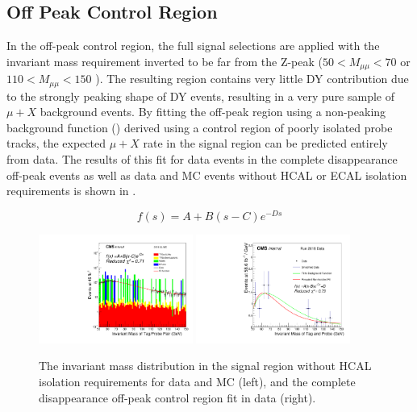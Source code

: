 \subsection{Off Peak Control Region}
In the off-peak control region, the full signal selections are applied with the invariant mass requirement inverted to be far from the Z-peak ($50<M_{\mu\mu}<70$ or $110<M_{\mu\mu}<150$ \GeV). 
The resulting region contains very little DY contribution due to the strongly peaking shape of DY events, resulting in a very pure sample of $\mu+X$ background events. 
By fitting the off-peak region using a non-peaking background function () derived using a control region of poorly isolated probe tracks, the expected $\mu+X$ rate in the signal region can be predicted entirely from data. 
The results of this fit for data events in the complete disappearance off-peak events as well as data and MC events without HCAL or ECAL isolation requirements is shown in .

\begin{equation} 
    \label{eq:bkgfunc}
    f(s)=A+B(s-C)e^{-Ds} 
\end{equation}

\begin{figure}[htp]
    \centering
    \includegraphics[width=0.45\textwidth]{figures/offPeakCr_noIso.pdf}
    \hspace{0.01\textwidth}
    \includegraphics[width=0.45\textwidth]{figures/offPeakCr_fit.pdf} 
     \caption[$\mu$+X background fits in the off-peak control region for complete disappearance events]{The invariant mass distribution in the signal region without HCAL isolation requirements for data and MC (left), and the complete disappearance off-peak control region fit in data (right).}
    \label{fig:offpeakfit}
 \end{figure}
 
